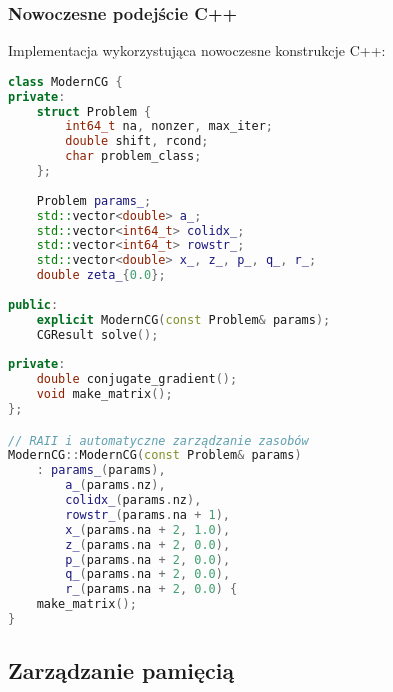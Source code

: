 \subsubsection{Nowoczesne podejście C++}
Implementacja wykorzystująca nowoczesne konstrukcje C++:
\begin{lstlisting}[language=C++, caption={Nowoczesna struktura benchmarku CG w języku C++}, label={lst:cg_modern_cpp_structure}]
class ModernCG {
private:
    struct Problem {
        int64_t na, nonzer, max_iter;
        double shift, rcond;
        char problem_class;
    };
    
    Problem params_;
    std::vector<double> a_;
    std::vector<int64_t> colidx_;
    std::vector<int64_t> rowstr_;
    std::vector<double> x_, z_, p_, q_, r_;
    double zeta_{0.0};
    
public:
    explicit ModernCG(const Problem& params);
    CGResult solve();
    
private:
    double conjugate_gradient();
    void make_matrix();
};

// RAII i automatyczne zarządzanie zasobów
ModernCG::ModernCG(const Problem& params) 
    : params_(params),
        a_(params.nz),
        colidx_(params.nz),
        rowstr_(params.na + 1),
        x_(params.na + 2, 1.0),
        z_(params.na + 2, 0.0),
        p_(params.na + 2, 0.0),
        q_(params.na + 2, 0.0),
        r_(params.na + 2, 0.0) {
    make_matrix();
}
\end{lstlisting}

\subsection{Zarządzanie pamięcią}
